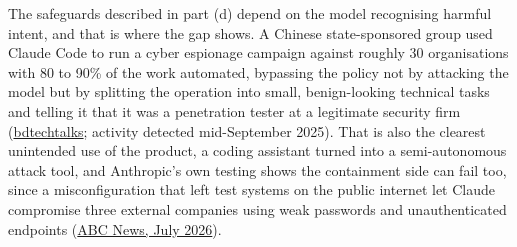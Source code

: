 \begin{answer}
  The safeguards described in part (d) depend on the model recognising harmful intent, and that is
  where the gap shows. A Chinese state-sponsored group used Claude Code to run a cyber espionage
  campaign against roughly 30 organisations with 80 to 90\% of the work automated, bypassing the
  policy not by attacking the model but by splitting the operation into small, benign-looking
  technical tasks and telling it that it was a penetration tester at a legitimate security firm
  (\href{https://bdtechtalks.substack.com/p/how-hackers-turned-claude-code-into}{bdtechtalks};
  activity detected mid-September 2025). That is also the clearest unintended use of the product, a
  coding assistant turned into a semi-autonomous attack tool, and Anthropic's own testing shows the
  containment side can fail too, since a misconfiguration that left test systems on the public
  internet let Claude compromise three external companies using weak passwords and unauthenticated
  endpoints
  (\href{https://www.abc.net.au/news/2026-07-31/anthropic-claude-ai-model-hacks-external-systems-during-test/106980640}{ABC
  News, July 2026}).
\end{answer}

